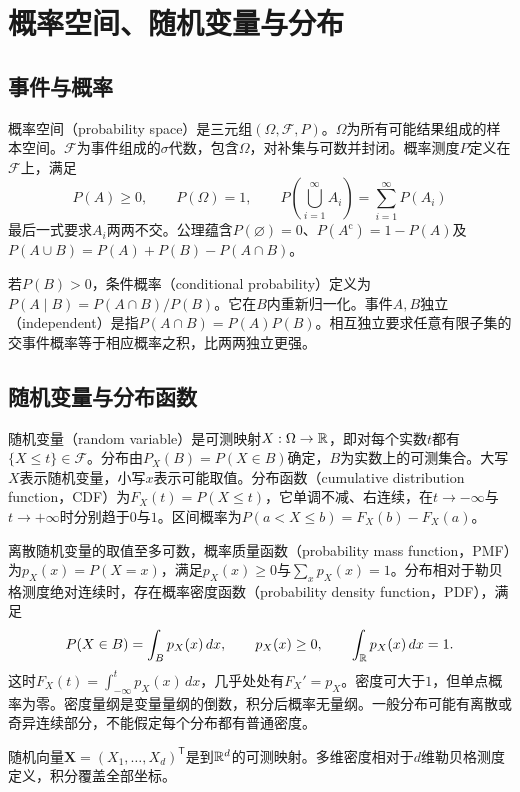 \section{概率空间、随机变量与分布}
\subsection{事件与概率}
概率空间（probability space）是三元组$(\Omega,\mathcal F,P)$。$\Omega$为所有可能结果组成的样本空间。$\mathcal F$为事件组成的$\sigma$代数，包含$\Omega$，对补集与可数并封闭。概率测度$P$定义在$\mathcal F$上，满足
\begin{equation}
 P(A)\geq0,\qquad P(\Omega)=1,\qquad
 P\left(\bigcup_{i=1}^\infty A_i\right)=\sum_{i=1}^\infty P(A_i)
\end{equation}
最后一式要求$A_i$两两不交。公理蕴含$P(\varnothing)=0$、$P(A^{\mathrm c})=1-P(A)$及$P(A\cup B)=P(A)+P(B)-P(A\cap B)$。

若$P(B)>0$，条件概率（conditional probability）定义为$P(A\mid B)=P(A\cap B)/P(B)$。它在$B$内重新归一化。事件$A,B$独立（independent）是指$P(A\cap B)=P(A)P(B)$。相互独立要求任意有限子集的交事件概率等于相应概率之积，比两两独立更强。

\subsection{随机变量与分布函数}
随机变量（random variable）是可测映射$X:\Omega\to\mathbb{R}$，即对每个实数$t$都有$\{X\leq t\}\in\mathcal F$。分布由$P_X(B)=P(X\in B)$确定，$B$为实数上的可测集合。大写$X$表示随机变量，小写$x$表示可能取值。分布函数（cumulative distribution function，CDF）为$F_X(t)=P(X\leq t)$，它单调不减、右连续，在$t\to-\infty$与$t\to+\infty$时分别趋于$0$与$1$。区间概率为$P(a<X\leq b)=F_X(b)-F_X(a)$。

离散随机变量的取值至多可数，概率质量函数（probability mass function，PMF）为$p_X(x)=P(X=x)$，满足$p_X(x)\geq0$与$\sum_xp_X(x)=1$。分布相对于勒贝格测度绝对连续时，存在概率密度函数（probability density function，PDF），满足
\begin{equation}
 P(X\in B)=\int_Bp_X(x)\,dx,\qquad p_X(x)\geq0,\qquad\int_{\mathbb{R}}p_X(x)\,dx=1.
\end{equation}
这时$F_X(t)=\int_{-\infty}^t p_X(x)\,dx$，几乎处处有$F_X'=p_X$。密度可大于$1$，但单点概率为零。密度量纲是变量量纲的倒数，积分后概率无量纲。一般分布可能有离散或奇异连续部分，不能假定每个分布都有普通密度。

随机向量$\bm X=(X_1,\ldots,X_d)^{\mathsf T}$是到$\mathbb{R}^d$的可测映射。多维密度相对于$d$维勒贝格测度定义，积分覆盖全部坐标。

